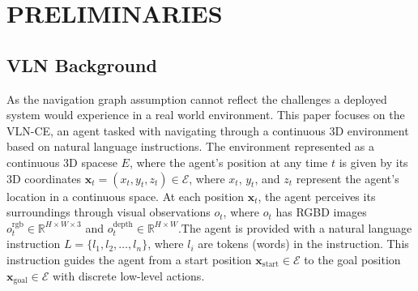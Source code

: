 \section{PRELIMINARIES}

\subsection{VLN Background}

As the navigation graph assumption cannot reflect the challenges a deployed system would experience in a real world environment. This paper focuses on the VLN-CE, an agent tasked with navigating through a continuous 3D environment based on natural language instructions. The environment represented as a continuous 3D spacese \(E\), where the agent’s position at any time \( t \) is given by its 3D coordinates \( \mathbf{x}_t = (x_t, y_t, z_t) \in \mathcal{E} \), where \( x_t \), \( y_t \), and \( z_t \) represent the agent’s location in a continuous space.
At each position \( \mathbf{x}_t \), the agent perceives its surroundings through visual observations \( o_t\), where \( o_t\) has RGBD images \( o_t^{\text{rgb}} \in \mathbb{R}^{H \times W \times 3} \) and \( o_t^{\text{depth}} \in \mathbb{R}^{H \times W} \).The agent is provided with a natural language instruction \( L = \{ l_1, l_2, \dots, l_n \} \), where \( l_i \) are tokens (words) in the instruction. This instruction guides the agent from a start position \( \mathbf{x}_{\text{start}} \in \mathcal{E} \) to the goal position \( \mathbf{x}_{\text{goal}} \in \mathcal{E} \) with discrete low-level actions.

